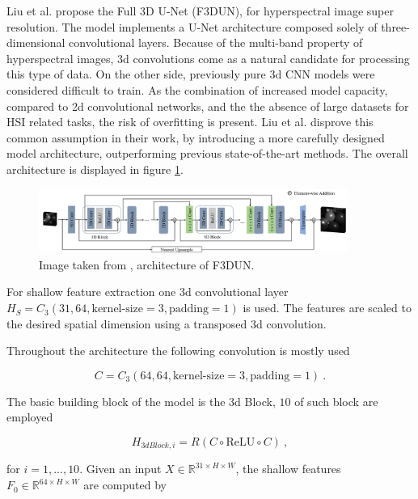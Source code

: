 Liu et al. \cite{liuRethinking3DCNNHyperspectral2023} propose the Full 3D U-Net (F3DUN),
for hyperspectral image super resolution.
The model implements a U-Net architecture composed solely of three-dimensional convolutional layers.
Because of the multi-band property of hyperspectral images,
3d convolutions come as a natural candidate for processing this type of data.
On the other side, previously pure 3d CNN models were considered difficult to train. 
As the combination of increased model capacity, compared to 2d convolutional networks,
and the the absence of large datasets for HSI related tasks,
the risk of overfitting is present.
Liu et al. \cite{liuRethinking3DCNNHyperspectral2023} disprove this common assumption in their work,
by introducing a more carefully designed model architecture,
outperforming previous state-of-the-art methods.
The overall architecture is displayed in figure \ref{fig:f3dun}.

\begin{figure}[h!]
    \includegraphics[width=0.9\textwidth]{models/hsisr/imgs/f3dun.png}
    \caption{Image taken from \cite{liuRethinking3DCNNHyperspectral2023}, architecture of F3DUN.}
    \label{fig:f3dun}
\end{figure}

For shallow feature extraction one 3d convolutional layer $H_S = C_3(31, 64, \text{kernel-size}=3, \text{padding}=1)$ is used.
The features are scaled to the desired spatial dimension using a transposed 3d convolution.

\noindent Throughout the architecture the following convolution is mostly used

 \begin{equation*}
    C = C_3(64, 64, \text{kernel-size}=3, \text{padding}=1) ~.
 \end{equation*}

The basic building block of the model is the 3d Block,
$10$ of such block are employed 

\begin{equation} \label{eq:3dblock}
    H_{3dBlock, i} = R(C \circ \text{ReLU} \circ C) ~,
\end{equation}

\noindent for $i = 1, ..., 10$. 
Given an input $X \in \mathbb R^{31 \times H \times W}$, 
the shallow features $F_0 \in \mathbb R^{64 \times H \times W}$ are computed by

